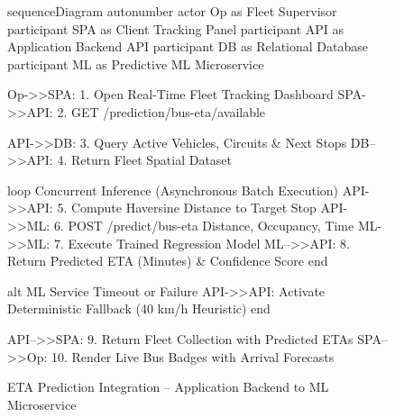\begin{figure}[H]
  \centering
  \begin{mermaid}[width=0.98\textwidth]
sequenceDiagram
    autonumber
    actor Op as Fleet Supervisor
    participant SPA as Client Tracking Panel
    participant API as Application Backend API
    participant DB as Relational Database
    participant ML as Predictive ML Microservice

    Op->>SPA: 1. Open Real-Time Fleet Tracking Dashboard
    SPA->>API: 2. GET /prediction/bus-eta/available

    API->>DB: 3. Query Active Vehicles, Circuits & Next Stops
    DB-->>API: 4. Return Fleet Spatial Dataset

    loop Concurrent Inference (Asynchronous Batch Execution)
        API->>API: 5. Compute Haversine Distance to Target Stop
        API->>ML: 6. POST /predict/bus-eta {Distance, Occupancy, Time}
        ML->>ML: 7. Execute Trained Regression Model
        ML-->>API: 8. Return Predicted ETA (Minutes) & Confidence Score
    end

    alt ML Service Timeout or Failure
        API->>API: Activate Deterministic Fallback (40 km/h Heuristic)
    end

    API-->>SPA: 9. Return Fleet Collection with Predicted ETAs
    SPA-->>Op: 10. Render Live Bus Badges with Arrival Forecasts
  \end{mermaid}
  \caption{ETA Prediction Integration -- Application Backend to ML Microservice}
  \label{fig:ml_prediction_pipeline}
\end{figure}


